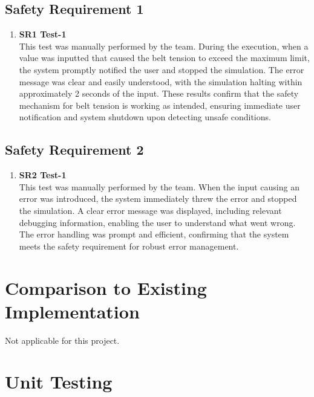 \documentclass[12pt, titlepage]{article}
\begin{document}
\subsection{Safety Requirement 1}
\begin{enumerate}
  \item {\textbf{SR1 Test-1}}\\
  This test was manually performed by the team. During the execution, when a value was inputted that caused the belt tension to exceed the maximum limit, the system promptly notified the user and stopped the simulation. The error message was clear and easily understood, with the simulation halting within approximately 2 seconds of the input. These results confirm that the safety mechanism for belt tension is working as intended, ensuring immediate user notification and system shutdown upon detecting unsafe conditions.
  \end{enumerate}

\subsection{Safety Requirement 2}
  \begin{enumerate}
    \item {\textbf{SR2 Test-1}}\\
    This test was manually performed by the team. When the input causing an error was introduced, the system immediately threw the error and stopped the simulation. A clear error message was displayed, including relevant debugging information, enabling the user to understand what went wrong. The error handling was prompt and efficient, confirming that the system meets the safety requirement for robust error management.
    \end{enumerate}

\section{Comparison to Existing Implementation}	

Not applicable for this project.
\section{Unit Testing}
\end{document}
